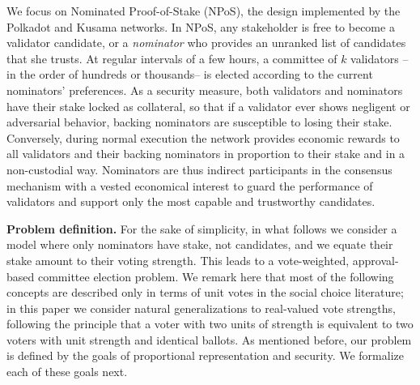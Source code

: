 We focus on Nominated Proof-of-Stake (NPoS), the design implemented by the Polkadot and Kusama networks. In NPoS, any stakeholder is free to become a validator candidate, or a \emph{nominator} who provides an unranked list of candidates that she trusts. At regular intervals of a few hours, a committee of $k$ validators --in the order of hundreds or thousands-- is elected according to the current nominators' preferences. 
As a security measure, both validators and nominators have their stake locked as collateral, so that if a validator ever shows negligent or adversarial behavior, backing nominators are susceptible to losing their stake. Conversely, during normal execution the network provides economic rewards to all validators and their backing nominators in proportion to their stake and in a non-custodial way. Nominators are thus indirect participants in the consensus mechanism with a vested economical interest to guard the performance of validators and support only the most capable and trustworthy candidates.

\textbf{Problem definition.}
For the sake of simplicity, in what follows we consider a model where only nominators have stake, not candidates, and we equate their stake amount to their voting strength. This leads to a vote-weighted, approval-based committee election problem. We remark here that most of the following concepts are described only in terms of unit votes in the social choice literature; in this paper we consider natural generalizations to real-valued vote strengths, following the principle that a voter with two units of strength is equivalent to two voters with unit strength and identical ballots. 
As mentioned before, our problem is defined by the goals of proportional representation and security. We formalize each of these goals next. 

